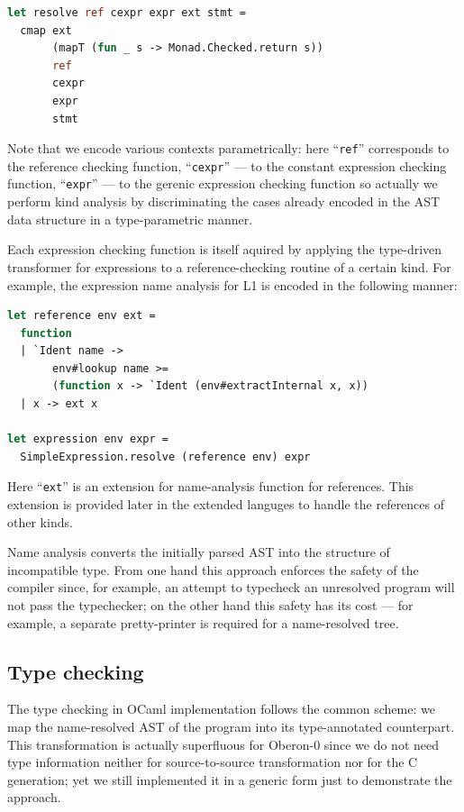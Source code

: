 \begin{lstlisting}[language=ocaml]
let resolve ref cexpr expr ext stmt =
  cmap ext 
       (mapT (fun _ s -> Monad.Checked.return s)) 
       ref 
       cexpr 
       expr 
       stmt
\end{lstlisting}

Note that we encode various contexts parametrically: here ``\lstinline{ref}'' corresponds
to the reference checking function, ``\lstinline{cexpr}'' --- to the constant expression 
checking function, ``\lstinline{expr}'' --- to the gerenic expression checking function
so actually we perform kind analysis by discriminating the cases already encoded in
the AST data structure in a type-parametric manner. 

Each expression checking function is itself aquired by applying the type-driven transformer 
for expressions to a reference-checking routine of a certain kind. For example, the expression 
name analysis for L1 is encoded in the following manner:

\begin{lstlisting}[language=ocaml]
let reference env ext = 
  function
  | `Ident name -> 
       env#lookup name >= 
       (function x -> `Ident (env#extractInternal x, x))
  | x -> ext x

let expression env expr = 
  SimpleExpression.resolve (reference env) expr 
\end{lstlisting}

Here ``\lstinline{ext}'' is an extension for name-analysis function for references. This 
extension is provided later in the extended languges to handle the references of other kinds.

Name analysis converts the initially parsed AST into the structure of incompatible 
type. From one hand this approach enforces the safety of the compiler since, for example, an attempt
to typecheck an unresolved program will not pass the typechecker; on the other hand this
safety has its cost --- for example, a separate pretty-printer is required for a
name-resolved tree. 

\subsection{Type checking}

The type checking in OCaml implementation follows the common scheme: we map the name-resolved
AST of the program into its type-annotated counterpart. This transformation is
actually superfluous for Oberon-0 since we do not need type information neither for
source-to-source transformation nor for the C generation; yet we still implemented it in
a generic form just to demonstrate the approach.

